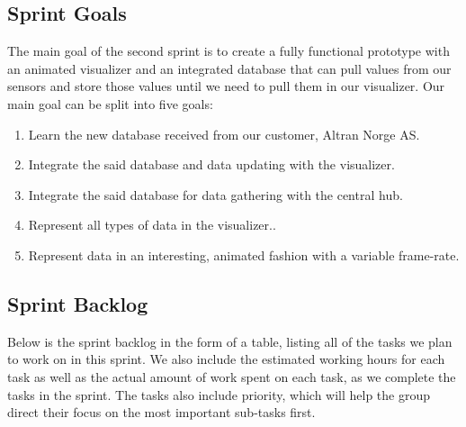 \documentclass[../document]{subfiles}
\begin{document}
\subsection{Sprint Goals}
The main goal of the second sprint is to create a fully functional prototype with an animated visualizer and an integrated database that can pull values from our sensors and store those values until we need to pull them in our visualizer. Our main goal can be split into five goals:
\begin{enumerate}
\item
Learn the new database received from our customer, Altran Norge AS.
\item
Integrate the said database and data updating with the visualizer.
\item
Integrate the said database for data gathering with the central hub.
\item
Represent all types of data in the visualizer..
\item
Represent data in an interesting, animated fashion with a variable frame-rate.
\end{enumerate}

\subsection{Sprint Backlog}
Below is the sprint backlog in the form of a table, listing all of the tasks we plan to work on in this sprint. We also include the estimated working hours for each task as well as the actual amount of work spent on each task, as we complete the tasks in the sprint. The tasks also include priority, which will help the group direct their focus on the most important sub-tasks first.
\end{document}
